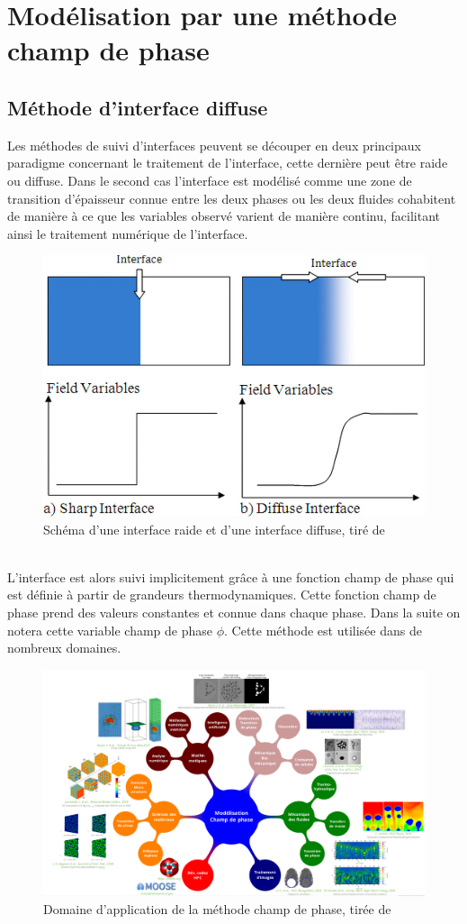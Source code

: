 \documentclass[a4paper,11pt,fleqn]{report}    %
\begin{document}
\chapter{Modélisation par une méthode champ de phase}
\section{Méthode d'interface diffuse}

Les méthodes de suivi d'interfaces peuvent se découper en deux principaux paradigme concernant le traitement de l'interface, cette dernière peut être raide ou diffuse. Dans le second cas l'interface est modélisé comme une zone de transition d'épaisseur connue entre les deux phases ou les deux fluides cohabitent de manière à ce que les variables observé varient de manière continu, facilitant ainsi le traitement numérique de l'interface.
\begin{figure}[h!]
	\centering
	\includegraphics[width=0.3\linewidth]{figure/diffuse_interface}
	\caption[Schéma d'une interface raide et d'une interface diffuse]{Schéma d'une interface raide et d'une interface diffuse, tiré de \cite{samkhaniani_evaluation_2017}}
	\label{fig:diffuseinterface}
\end{figure} \\
L'interface est alors suivi implicitement grâce à une fonction champ de phase qui est définie à partir de grandeurs thermodynamiques. Cette fonction champ de phase prend des valeurs constantes et connue dans chaque phase. Dans la suite on notera cette variable champ de phase $\phi$. Cette méthode est utilisée dans de nombreux domaines.


\begin{figure}[h!]
	\centering
	\includegraphics[width=0.9\linewidth]{figure/champ_phase}
	\caption[Domaine d'application de la méthode champ de phase]{Domaine d'application de la méthode champ de phase, tirée de \cite{introini_suivi_nodate}}
	\label{fig:champphase}
\end{figure} 
\end{document}
